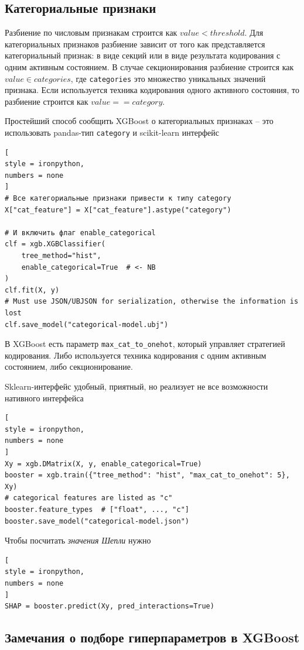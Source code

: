 \documentclass[%
	11pt,
	a4paper,
	utf8,
		]{article}
\begin{document}
\subsection{Категориальные признаки}

Разбиение по числовым признакам строится как $ value < threshold $. Для категориальных признаков разбиение зависит от того как представляется категориальный признак: в виде секций или в виде результата кодирования с одним активным состоянием. В случае секционирования разбиение строится как $ value \in categories $, где  \verb|categories| это множество уникальных значений признака. Если используется техника кодирования одного активного состояния, то разбиение строится как $ value == category $.

Простейший способ сообщить XGBoost о категориальных признаках -- это использовать pandas-тип \verb|category| и scikit-learn интерфейс
\begin{lstlisting}[
style = ironpython,
numbers = none
]
# Все категориальные признаки привести к типу category
X["cat_feature"] = X["cat_feature"].astype("category")

# И включить флаг enable_categorical
clf = xgb.XGBClassifier(
    tree_method="hist",
    enable_categorical=True  # <- NB
)
clf.fit(X, y)
# Must use JSON/UBJSON for serialization, otherwise the information is lost
clf.save_model("categorical-model.ubj")
\end{lstlisting}

В XGBoost есть параметр \verb|max_cat_to_onehot|, который управляет стратегией кодирования. Либо используется техника кодирования с одним активным состоянием, либо секционирование.

Sklearn-интерфейс удобный, приятный, но реализует не все возможности нативного интерфейса
\begin{lstlisting}[
style = ironpython,
numbers = none
]
Xy = xgb.DMatrix(X, y, enable_categorical=True)
booster = xgb.train({"tree_method": "hist", "max_cat_to_onehot": 5}, Xy)
# categorical features are listed as "c"
booster.feature_types  # ["float", ..., "c"]
booster.save_model("categorical-model.json")
\end{lstlisting}

Чтобы посчитать \emph{значения Шепли} нужно
\begin{lstlisting}[
style = ironpython,
numbers = none
]
SHAP = booster.predict(Xy, pred_interactions=True)
\end{lstlisting}


\subsection{Замечания о подборе гиперпараметров в XGBoost}
\end{document}
